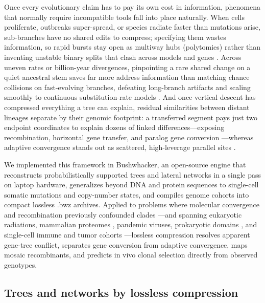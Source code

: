 \documentclass[12pt]{article}
\begin{document}
Once every evolutionary claim has to pay its own cost in information, phenomena that normally require incompatible tools fall into place naturally. When cells proliferate, outbreaks super-spread, or species radiate faster than mutations arise, sub-branches have no shared edits to compress; specifying them wastes information, so rapid bursts stay open as multiway hubs (polytomies) rather than inventing unstable binary splits that clash across models and genes \cite{rokas2006animal,shen2017contentious,abadi2019model}. Across uneven rates or billion-year divergences, pinpointing a rare shared change on a quiet ancestral stem saves far more address information than matching chance collisions on fast-evolving branches, defeating long-branch artifacts \cite{felsenstein1978cases} and scaling smoothly to continuous substitution-rate models \cite{yang1994maximum,le2008improved}. And once vertical descent has compressed everything a tree can explain, residual similarities between distant lineages separate by their genomic footprint: a transferred segment pays just two endpoint coordinates to explain dozens of linked differences---exposing recombination, horizontal gene transfer, and paralog gene conversion \cite{doolittle1999phylogenetic,worobey1999widespread}---whereas adaptive convergence stands out as scattered, high-leverage parallel sites \cite{liu2010convergent}.

We implemented this framework in Bushwhacker, an open-source engine that reconstructs probabilistically supported trees and lateral networks in a single pass on laptop hardware, generalizes beyond DNA and protein sequences to single-cell somatic mutations and copy-number states, and compiles genome cohorts into compact lossless .bwz archives. Applied to problems where molecular convergence and recombination previously confounded clades \cite{parker2013genome,zou2015no,turakhia2022pandemic}---and spanning eukaryotic radiations, mammalian proteomes \cite{malovichko2026toga2}, pandemic viruses, prokaryotic domains \cite{jain1999horizontal,parks2020gtdb}, and single-cell immune and tumor cohorts \cite{dewitt2026gcreplay,morita2020clonal}---lossless compression resolves apparent gene-tree conflict, separates gene conversion from adaptive convergence, maps mosaic recombinants, and predicts in vivo clonal selection directly from observed genotypes.

\subsection*{Trees and networks by lossless compression}
\end{document}
